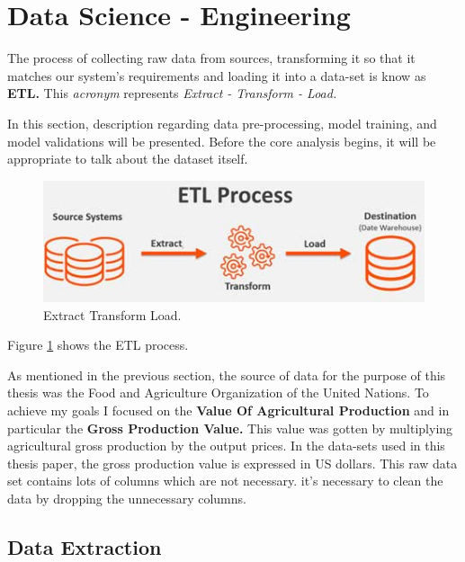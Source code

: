 \section{Data Science - Engineering}

The process of collecting raw data from sources, transforming it so that it matches our system's requirements and loading it into a data-set is know as \textbf{ETL.} This \textit{acronym} represents \textit{Extract - Transform - Load.}

In this section, description regarding data pre-processing, model training, and model validations will be presented. Before the core analysis begins, it will be appropriate to talk about the dataset itself.


\begin{figure}[h!]
	\includegraphics[width=\textwidth,height=\textheight,keepaspectratio]{fig/etl.jpg}
	\caption{Extract Transform Load.}
	\label{fig:ETL}
\end{figure}

Figure \ref{fig:ETL} shows the ETL process.

As mentioned in the previous section, the source of data for the purpose of this thesis was the Food and Agriculture Organization of the United Nations. To achieve my goals I focused on the \textbf{Value Of Agricultural Production} and in particular the \textbf{Gross Production Value.} This value was gotten by multiplying agricultural gross production by the output prices. In the data-sets used in this thesis paper, the gross production value is expressed in US dollars. This raw data set contains lots of columns which are not necessary. it's necessary to clean the data by dropping the unnecessary columns. 


\subsection{Data Extraction}

